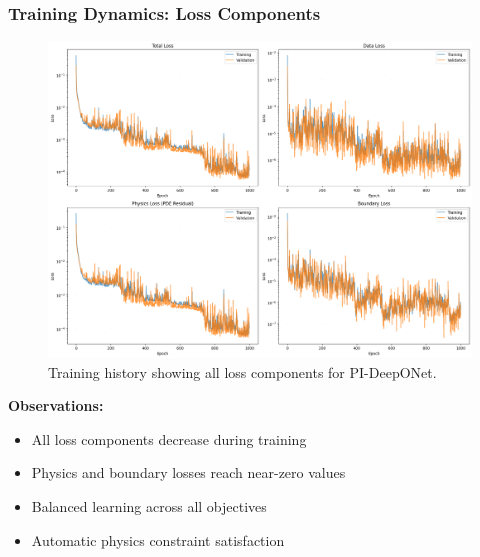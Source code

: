 \documentclass[notes]{beamer}
\begin{document}
\begin{frame}
\frametitle{Training Dynamics: Loss Components}

\begin{figure}[ht]
    \centering
    \includegraphics[width=\textwidth]{figs/pi_training_losses.png}
    \caption*{Training history showing all loss components for PI-DeepONet.}
\end{figure}

\textbf{Observations:}
\begin{itemize}
    \item All loss components decrease during training
    \item Physics and boundary losses reach near-zero values
    \item Balanced learning across all objectives
    \item Automatic physics constraint satisfaction
\end{itemize}

\end{frame}
\end{document}
